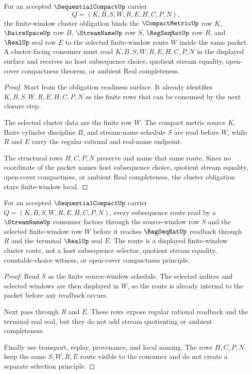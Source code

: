 \begin{theorem}
\label{thm:sequentialcompact-finite-window-cluster-obligation}
For an accepted $\SequentialCompactUp$ carrier
$$
Q=(K,B,S,W,R,E,H,C,P,N),
$$
the finite-window cluster obligation binds the $\CompactMetricUp$ row $K$, $\BaireSpaceUp$ row $B$, $\StreamNameUp$ row $S$, $\RegSeqRatUp$ row $R$, and $\RealUp$ seal row $E$ to the selected finite-window route $W$ inside the same packet. A cluster-facing consumer must read $K,B,S,W,R,E,H,C,P,N$ in the displayed surface and receives no host subsequence choice, quotient stream equality, open-cover compactness theorem, or ambient Real completeness.
\end{theorem}
\begin{proof}
Start from the obligation readiness surface. It already identifies $K,B,S,W,R,E,H,C,P,N$ as the finite rows that can be consumed by the next closure step.

The selected cluster data are the finite row $W$. The compact metric source $K$, Baire cylinder discipline $B$, and stream-name schedule $S$ are read before $W$, while $R$ and $E$ carry the regular rational and real-name endpoint.

The structural rows $H,C,P,N$ preserve and name that same route. Since no coordinate of the packet names host subsequence choice, quotient stream equality, open-cover compactness, or ambient Real completeness, the cluster obligation stays finite-window local.
\end{proof}

\begin{theorem}
\label{thm:sequentialcompact-streamname-subsequence-route}
For an accepted $\SequentialCompactUp$ carrier $Q=(K,B,S,W,R,E,H,C,P,N)$, every subsequence route read by a $\StreamNameUp$ consumer factors through the source-window row $S$ and the selected finite-window row $W$ before it reaches $\RegSeqRatUp$ readback through $R$ and the terminal $\RealUp$ seal $E$. The route is a displayed finite-window cluster route, not a host subsequence selector, quotient stream equality, countable-choice witness, or open-cover compactness principle.
\end{theorem}
\begin{proof}
Read $S$ as the finite source-window schedule. The selected indices and selected windows are then displayed in $W$, so the route is already internal to the packet before any readback occurs.

Next pass through $R$ and $E$. These rows expose regular rational readback and the terminal real seal, but they do not add stream quotienting or ambient completeness.

Finally use transport, replay, provenance, and local naming. The rows $H,C,P,N$ keep the same $S,W,R,E$ route visible to the consumer and do not create a separate selection principle.
\end{proof}

